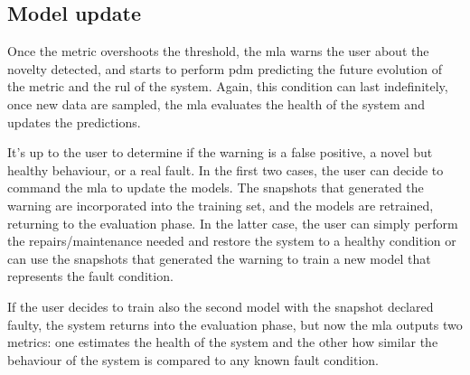 \subsection{Model update}
Once the metric overshoots the threshold, the \gls{mla} warns the user about the novelty detected, and starts to perform \gls{pdm} predicting the future evolution of the metric and the \gls{rul} of the system. 
Again, this condition can last indefinitely, once new data are sampled, the \gls{mla} evaluates the health of the system and updates the predictions.

It's up to the user to determine if the warning is a false positive, a novel but healthy behaviour, or a real fault. In the first two cases, the user can decide to command the \gls{mla} to update the models. The snapshots that generated the warning are incorporated into the training set, and the models are retrained, returning to the evaluation phase. In the latter case, the user can simply perform the repairs/maintenance needed and restore the system to a healthy condition or can use the snapshots that generated the warning to train a new model that represents the fault condition.

If the user decides to train also the second model with the snapshot declared faulty, the system returns into the evaluation phase, but now the \gls{mla} outputs two metrics: one estimates the health of the system and the other how similar the behaviour of the system is compared to any known fault condition.


